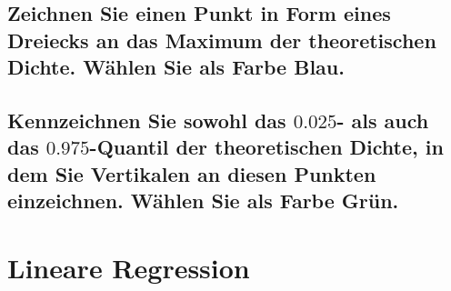 \documentclass[12pt,a4paper]{article}
\begin{document}
\hypertarget{zeichnen-sie-einen-punkt-in-form-eines-dreiecks-an-das-maximum-der-theoretischen-dichte.-wuxe4hlen-sie-als-farbe-blau.}{%
\subsection{Zeichnen Sie einen Punkt in Form eines Dreiecks an das
Maximum der theoretischen Dichte. Wählen Sie als Farbe
Blau.}\label{zeichnen-sie-einen-punkt-in-form-eines-dreiecks-an-das-maximum-der-theoretischen-dichte.-wuxe4hlen-sie-als-farbe-blau.}}

\hypertarget{kennzeichnen-sie-sowohl-das-0.025--als-auch-das-0.975-quantil-der-theoretischen-dichte-in-dem-sie-vertikalen-an-diesen-punkten-einzeichnen.-wuxe4hlen-sie-als-farbe-gruxfcn.}{%
\subsection{\texorpdfstring{Kennzeichnen Sie sowohl das \(0.025\)- als
auch das \(0.975\)-Quantil der theoretischen Dichte, in dem Sie
Vertikalen an diesen Punkten einzeichnen. Wählen Sie als Farbe
Grün.}{Kennzeichnen Sie sowohl das 0.025- als auch das 0.975-Quantil der theoretischen Dichte, in dem Sie Vertikalen an diesen Punkten einzeichnen. Wählen Sie als Farbe Grün.}}\label{kennzeichnen-sie-sowohl-das-0.025--als-auch-das-0.975-quantil-der-theoretischen-dichte-in-dem-sie-vertikalen-an-diesen-punkten-einzeichnen.-wuxe4hlen-sie-als-farbe-gruxfcn.}}

\hypertarget{lineare-regression}{%
\section{Lineare Regression}\label{lineare-regression}}
\end{document}
